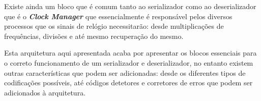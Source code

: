 Existe ainda um bloco que é comum tanto ao serializador como ao deserializador que é o \textbf{\textit{Clock Manager}} que essencialmente é responsável pelos diversos processos que os sinais de relógio necessitarão: desde multiplicações de frequências, divisões e até mesmo recuperação do mesmo.

Esta arquitetura aqui apresentada acaba por apresentar os blocos essenciais para o correto funcionamento de um serializador e deserializador, no entanto existem outras características que podem ser adicionadas: desde os diferentes tipos de codificações possíveis, até códigos detetores e corretores de erros que podem ser adicionados à arquitetura.





